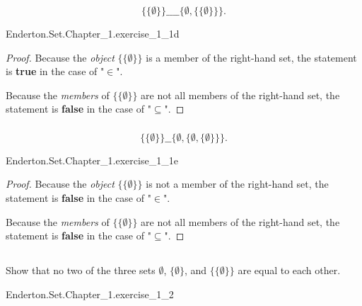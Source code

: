 \documentclass{report}
\begin{document}
\subsubsection{}%

  $$\{\{\emptyset\}\} \_\_\_\_ \{\emptyset, \{\{\emptyset\}\}\}.$$

    {Enderton.Set.Chapter\_1.exercise\_1\_1d}

  \begin{proof}
    Because the \textit{object} $\{\{\emptyset\}\}$ is a member of the
      right-hand set, the statement is \textbf{true} in the case of "$\in$".

    Because the \textit{members} of $\{\{\emptyset\}\}$ are not all members of
      the right-hand set, the statement is \textbf{false} in the case of
      "$\subseteq$".
  \end{proof}

\subsubsection{}%

  $$\{\{\emptyset\}\} \_\_ \{\emptyset, \{\emptyset, \{\emptyset\}\}\}.$$

    {Enderton.Set.Chapter\_1.exercise\_1\_1e}

  \begin{proof}
    Because the \textit{object} $\{\{\emptyset\}\}$ is not a member of the
      right-hand set, the statement is \textbf{false} in the case of "$\in$".

    Because the \textit{members} of $\{\{\emptyset\}\}$ are not all members of
      the right-hand set, the statement is \textbf{false} in the case of
      "$\subseteq$".
  \end{proof}

\subsection{}%

  Show that no two of the three sets $\emptyset$, $\{\emptyset\}$, and
    $\{\{\emptyset\}\}$ are equal to each other.

    {Enderton.Set.Chapter\_1.exercise\_1\_2}
\end{document}
